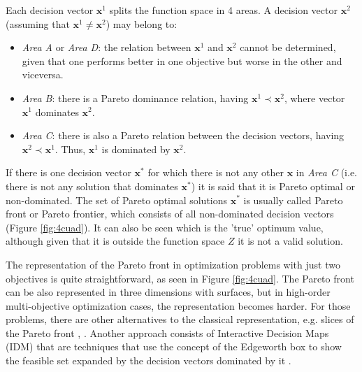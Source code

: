     Each decision vector $\bm{x}^1$ splits the function space in 4 areas. A decision vector $\bm{x}^2$ (assuming that $\bm{x}^1 \neq \bm{x}^2$) may belong to:
    \begin{itemize}
        \item \textit{Area A} or \textit{Area D}: the relation between $\bm{x}^1$ and $\bm{x}^2$ cannot be determined, given that one performs better in one objective but worse in the other and viceversa.
        \item \textit{Area B}: there is a Pareto dominance relation, having $\bm{x}^1 \prec \bm{x}^2$, where vector $\bm{x}^1$ dominates $\bm{x}^2$.
        \item \textit{Area C}: there is also a Pareto relation between the decision vectors, having $\bm{x}^2 \prec \bm{x}^1$. Thus, $\bm{x}^1$ is dominated by $\bm{x}^2$.
    \end{itemize}
    
    \newpage
    
    If there is one decision vector $\bm{x}^*$ for which there is not any other $\bm{x}$ in \textit{Area C} (i.e. there is not any solution that dominates $\bm{x}^*$) it is said that it is Pareto optimal or non-dominated. The set of Pareto optimal solutions $\bm{x}^*$ is usually called Pareto front or Pareto frontier, which consists of all non-dominated decision vectors (Figure \ref{fig:4cuad}). It can also be seen which is the 'true' optimum value, although given that it is outside the function space $Z$ it is not a valid solution.
    
    The representation of the Pareto front in optimization problems with just two objectives is quite straightforward, as seen in Figure \ref{fig:4cuad}. The Pareto front can be also represented in three dimensions with surfaces, but in high-order multi-objective optimization cases, the representation becomes harder. For those problems, there are other alternatives to the classical representation, e.g. slices of the Pareto front \cite{jaini2017fuzzy}, \cite{triantaphyllou2000multi}. Another approach consists of Interactive Decision Maps (IDM) that are techniques that use the concept of the Edgeworth box to show the feasible set expanded by the decision vectors dominated by it \cite{lotov2013interactive}.
    
